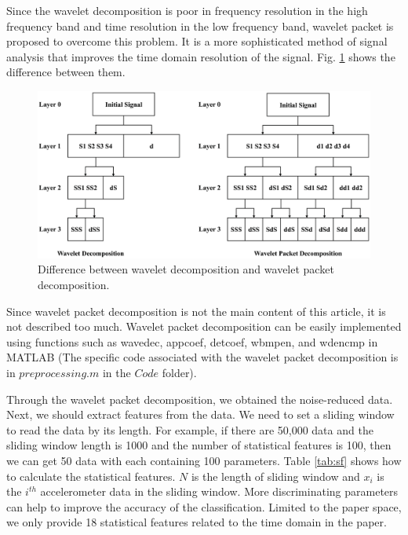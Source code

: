 \documentclass{modified}
\begin{document}
Since the wavelet decomposition \cite{Walczak1997Noise} is poor in frequency resolution in the high frequency band and time resolution in the low frequency band, wavelet packet is proposed to overcome this problem. It is a more sophisticated method of signal analysis that improves the time domain resolution of the signal. Fig. \ref{fig:wpd} shows the difference between them.

\begin{figure}[htbp]
	\centering
	\includegraphics[width=\columnwidth]{wpd.eps}
	\caption{Difference between wavelet decomposition and wavelet packet decomposition.}
	\label{fig:wpd}
\end{figure}

Since wavelet packet decomposition is not the main content of this article, it is not described too much. Wavelet packet decomposition can be easily implemented using functions such as wavedec, appcoef, detcoef, wbmpen, and wdencmp in MATLAB (The specific code associated with the wavelet packet decomposition is in $preprocessing.m$ in the $Code$ folder).

Through the wavelet packet decomposition, we obtained the noise-reduced data. Next, we should extract features from the data. We need to set a sliding window to read the data by its length. For example, if there are 50,000 data and the sliding window length is 1000 and the number of statistical features is 100, then we can get 50 data with each containing 100 parameters. Table \ref{tab:sf} shows how to calculate the statistical features. $N$ is the length of sliding window and $x_i$ is the $i^{th}$ accelerometer data in the sliding window. More discriminating parameters can help to improve the accuracy of the classification. Limited to the paper space, we only provide 18 statistical features related to the time domain in the paper.
\end{document}
